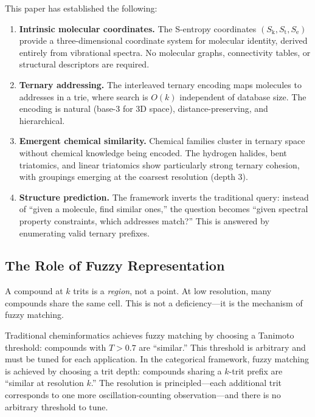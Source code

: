 \documentclass[11pt,twocolumn,a4paper]{article}
\theoremstyle{definition}
\theoremstyle{remark}
\newcommand{\Sk}{S_{\mathrm{k}}}
\newcommand{\St}{S_{\mathrm{t}}}
\newcommand{\Se}{S_{\mathrm{e}}}
\begin{document}
This paper has established the following:

\begin{enumerate}
\item \textbf{Intrinsic molecular coordinates.} The S-entropy coordinates $(\Sk, \St, \Se)$ provide a three-dimensional coordinate system for molecular identity, derived entirely from vibrational spectra. No molecular graphs, connectivity tables, or structural descriptors are required.

\item \textbf{Ternary addressing.} The interleaved ternary encoding maps molecules to addresses in a trie, where search is $O(k)$ independent of database size. The encoding is natural (base-3 for 3D space), distance-preserving, and hierarchical.

\item \textbf{Emergent chemical similarity.} Chemical families cluster in ternary space without chemical knowledge being encoded. The hydrogen halides, bent triatomics, and linear triatomics show particularly strong ternary cohesion, with groupings emerging at the coarsest resolution (depth 3).

\item \textbf{Structure prediction.} The framework inverts the traditional query: instead of ``given a molecule, find similar ones,'' the question becomes ``given spectral property constraints, which addresses match?'' This is answered by enumerating valid ternary prefixes.
\end{enumerate}

\subsection{The Role of Fuzzy Representation}

A compound at $k$ trits is a \emph{region}, not a point. At low resolution, many compounds share the same cell. This is not a deficiency---it is the mechanism of fuzzy matching.

Traditional cheminformatics achieves fuzzy matching by choosing a Tanimoto threshold: compounds with $T > 0.7$ are ``similar.'' This threshold is arbitrary and must be tuned for each application. In the categorical framework, fuzzy matching is achieved by choosing a trit depth: compounds sharing a $k$-trit prefix are ``similar at resolution $k$.'' The resolution is principled---each additional trit corresponds to one more oscillation-counting observation---and there is no arbitrary threshold to tune.
\end{document}
